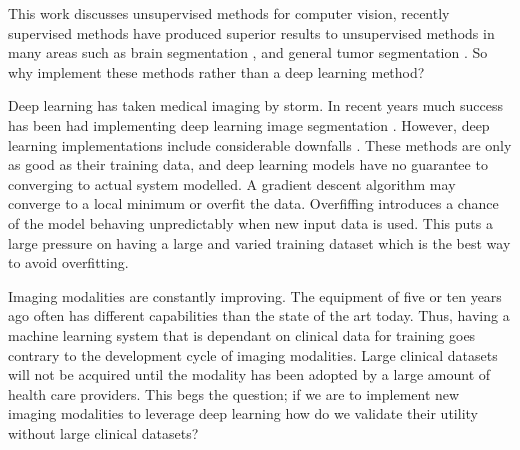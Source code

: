 \documentclass[a4paper,11pt]{article}
\begin{document}
This work discusses unsupervised methods for computer vision, recently supervised methods have produced superior results to unsupervised methods in many areas such as brain segmentation \cite{Bakas2018IdentifyingChallenge}, and general tumor segmentation \cite{Simpson2019AAlgorithms}. So why implement these methods rather than a deep learning method?



Deep learning has taken medical imaging by storm. In recent years much success has been had implementing deep learning image segmentation \cite{IsenseeNnU-Net:Segmentation,Ronneberger2015U-Net:Segmentation}. However, deep learning implementations include considerable downfalls \cite{Marcus2018DeepAppraisal}. These methods are only as good as their training data, and deep learning models have no guarantee to converging to actual system modelled. A gradient descent algorithm may converge to a local minimum or overfit the data. Overfiffing introduces a chance of the model behaving unpredictably when new input data is used. This puts a large pressure on having a large and varied training dataset which is the best way to avoid overfitting.

Imaging modalities are constantly improving. The equipment of five or ten years ago often has different capabilities than the state of the art today. Thus, having a machine learning system that is dependant on clinical data for training goes contrary to the development cycle of imaging modalities. Large clinical datasets will not be acquired until the modality has been adopted by a large amount of health care providers. This begs the question; if we are to implement new imaging modalities to leverage deep learning how do we validate their utility without large clinical datasets?
\end{document}
